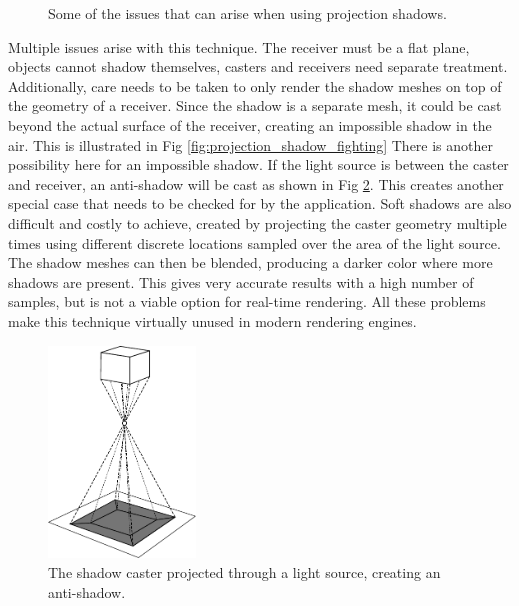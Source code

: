 \begin{figure}[h]
    \caption{Some of the issues that can arise when using projection shadows.}
    \label{fig:projection_shadow_issues}
\end{figure}

Multiple issues arise with this technique. The receiver must be a flat plane, objects cannot shadow themselves, casters and receivers need separate treatment. Additionally, care needs to be taken to only render the shadow meshes on top of the geometry of a receiver. Since the shadow is a separate mesh, it could be cast beyond the actual surface of the receiver, creating an impossible shadow in the air. This is illustrated in Fig \ref{fig:projection_shadow_fighting} There is another possibility here for an impossible shadow. If the light source is between the caster and receiver, an anti-shadow will be cast as shown in Fig \ref{fig:projection_anti_shadow}. This creates another special case that needs to be checked for by the application. Soft shadows are also difficult and costly to achieve, created by projecting the caster geometry multiple times using different discrete locations sampled over the area of the light source. The shadow meshes can then be blended, producing a darker color where more shadows are present. This gives very accurate results with a high number of samples, but is not a viable option for real-time rendering. All these problems make this technique virtually unused in modern rendering engines.
\begin{figure}[hb]
	\centering
	\includegraphics[width=0.35\textwidth]{./graf/projection_anti_shadow.pdf}
	\caption{The shadow caster projected through a light source, creating an anti-shadow.}
	\label{fig:projection_anti_shadow}
\end{figure}


